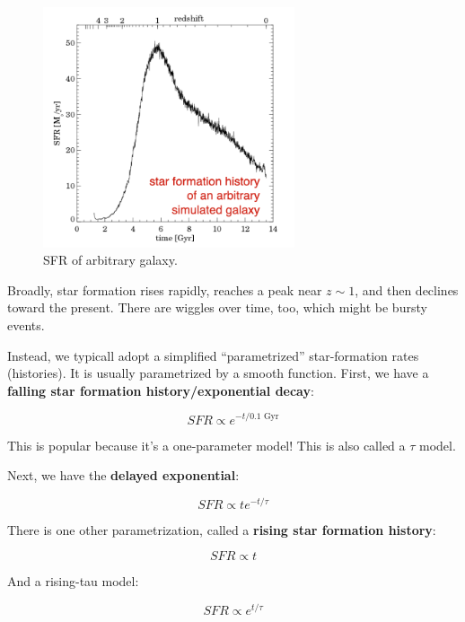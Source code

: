 \documentclass{article}
\begin{document}
\begin{figure}
    \centering
    \includegraphics[width=0.66\textwidth]{figs/Screen Shot 2021-09-24 at 9.31.17 AM.png}
    \caption{SFR of arbitrary galaxy.}
    \label{fig:galsfrarb}
\end{figure}

Broadly, star formation rises rapidly, reaches a peak near $z\sim1$, and then declines toward the present. There are wiggles over time, too, which might be bursty events. 

Instead, we typicall adopt a simplified ``parametrized'' star-formation rates (histories). It is usually parametrized by a smooth function. First, we have a \textbf{falling star formation history/exponential decay}:

\begin{equation}
    SFR \propto e^{-t/\text{0.1 Gyr}} 
\end{equation}

This is popular because it's a one-parameter model! This is also called a $\tau$ model.

Next, we have the \textbf{delayed exponential}:

\begin{equation}
    SFR \propto te^{-t/\tau}
\end{equation}

There is one other parametrization, called a \textbf{rising star formation history}:

\begin{equation}
    SFR \propto t
\end{equation}

And a rising-tau model:

\begin{equation}
    SFR \propto e^{t/\tau}
\end{equation}
\end{document}
